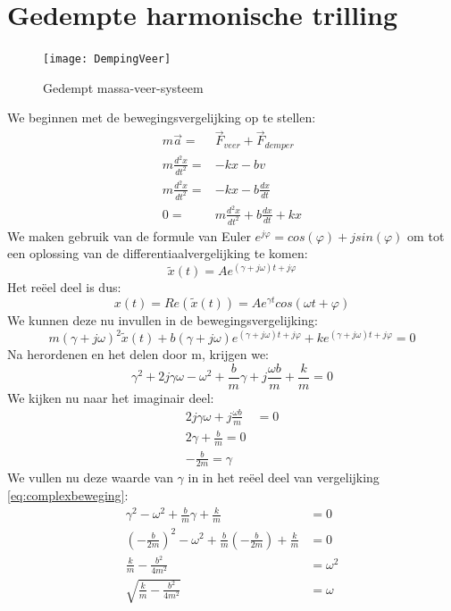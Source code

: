 \documentclass[a4paper,kul]{kulakarticle} %
\begin{document}
\section{Gedempte harmonische trilling}
\begin{figure}[htbp]
	\centering
	\texttt{[image: DempingVeer]}
	\caption[Gedempt massa veer systeem]{Gedempt massa-veer-systeem}
	\label{fig:dempingveer}
\end{figure}
We beginnen met de bewegingsvergelijking op te stellen:
\begin{align*}
	m \vec{a} =& \vec{F}_{veer} + \vec{F}_{demper}\\
	m \frac{d^2x}{dt^2} = & -kx - bv\\
	m \frac{d^2x}{dt^2} = & -kx - b\frac{dx}{dt}\\
	0 = & m \frac{d^2x}{dt^2} + b\frac{dx}{dt} + kx
\end{align*}
We maken gebruik van de formule van Euler $e^{j\varphi}=cos(\varphi) +jsin(\varphi)$ om tot een oplossing van de differentiaalvergelijking te komen:
\begin{equation*}
	\widetilde{x}(t) = Ae^{(\gamma +j\omega)t+j\varphi}
\end{equation*}
Het reëel deel is dus:
\begin{equation*}
	x(t) = Re(\widetilde{x}(t)) = Ae^{\gamma t}cos(\omega t + \varphi)
\end{equation*}
We kunnen deze nu invullen in de bewegingsvergelijking:
\begin{equation}
	\label{eq:complexbeweging}
	m(\gamma +j\omega)^2\widetilde{x}(t) + b(\gamma +j\omega)e^{(\gamma +j\omega)t+j\varphi}+ke^{(\gamma +j\omega)t+j\varphi} = 0
\end{equation}
Na herordenen en het delen door m, krijgen we:
\begin{equation*}
	\gamma^2+2j\gamma\omega-\omega^2+\frac{b}{m}\gamma+j\frac{\omega b}{m}+\frac{k}{m}=0
\end{equation*}
We kijken nu naar het imaginair deel:
\begin{align*}
	2j\gamma \omega +j\frac{\omega b}{m}&=0\\
	2\gamma + \frac{b}{m} = 0\\
	-\frac{b}{2m} = \gamma
\end{align*}
We vullen nu deze waarde van $\gamma$ in in het reëel deel van vergelijking \ref{eq:complexbeweging}:
\begin{align*}
	\gamma^2-\omega^2+\frac{b}{m}\gamma+\frac{k}{m} &=0\\
	(-\frac{b}{2m})^2-\omega^2+\frac{b}{m}(-\frac{b}{2m})+\frac{k}{m} &=0\\ 
	\frac{k}{m}-\frac{b^2}{4m^2}&=\omega^2\\
	\sqrt{\frac{k}{m}-\frac{b^2}{4m^2}}&=\omega
\end{align*}
\end{document}
